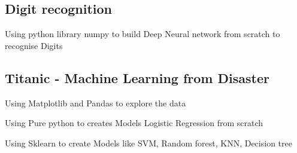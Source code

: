 \documentclass[letter,10pt]{article}
\begin{document}
\subsection{{Digit recognition}}
\begin{zitemize}
\item Using python library numpy to build Deep Neural network from scratch to recognise Digits
\end{zitemize}

\subsection{{ Titanic - Machine Learning from Disaster}}
\begin{zitemize}
\item Using Matplotlib and Pandas to explore the data
\item Using Pure python to creates Models {Logistic Regression} from scratch
\item Using Sklearn to create Models like SVM, Random forest, KNN, Decision tree

\end{zitemize}
\end{document}
